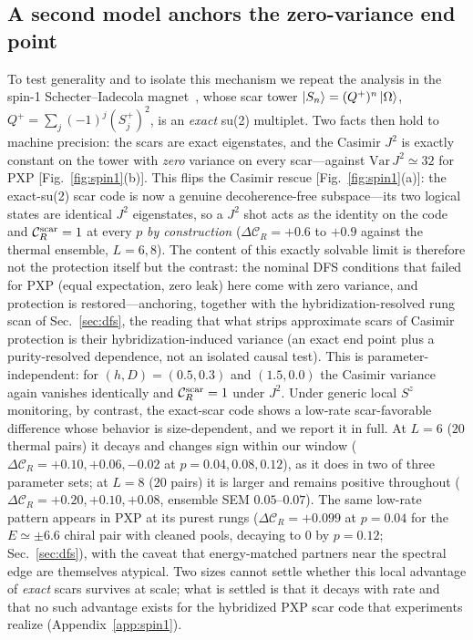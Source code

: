 \documentclass[a4paper,11pt,twocolumn,unpublished]{quantumarticle}
\newcommand{\CR}{\mathcal{C}_R}
\begin{document}
\subsection{A second model anchors the zero-variance end point}
\label{sec:spin1}
To test generality and to isolate this mechanism we repeat the analysis in the
spin-1 Schecter--Iadecola magnet~\cite{Schecter2019}, whose scar tower
$\ket{S_n}=(Q^+)^n\ket{\Omega}$, $Q^+=\sum_j(-1)^j(S_j^+)^2$, is an \emph{exact}
su(2) multiplet. Two facts then hold to machine precision: the scars are exact
eigenstates, and the Casimir $J^2$ is exactly constant on the tower with
\emph{zero} variance on every scar---against $\mathrm{Var}\,J^2\simeq32$ for PXP
[Fig.~\ref{fig:spin1}(b)]. This flips the Casimir rescue
[Fig.~\ref{fig:spin1}(a)]: the exact-su(2) scar code is now a genuine
decoherence-free subspace---its two logical states are identical $J^2$
eigenstates, so a $J^2$ shot acts as the identity on the code and
$\CR^{\rm scar}=1$ at every $p$ \emph{by construction}
($\Delta\CR=+0.6$ to $+0.9$ against the thermal ensemble, $L=6,8$). The
content of this exactly solvable limit is therefore not the protection
itself but the contrast: the nominal DFS conditions that failed for PXP
(equal expectation, zero leak) here come with zero variance, and protection
is restored---anchoring, together with the hybridization-resolved rung scan
of Sec.~\ref{sec:dfs}, the reading that what strips approximate scars of
Casimir protection is their hybridization-induced variance (an exact end
point plus a purity-resolved dependence, not an isolated causal test). This is parameter-independent: for $(h,D)=(0.5,0.3)$ and
$(1.5,0.0)$ the Casimir variance again vanishes identically and $\CR^{\rm
scar}=1$ under $J^2$. Under generic local $S^z$ monitoring, by contrast, the
exact-scar code shows a low-rate scar-favorable difference whose behavior is
size-dependent, and we report it in full. At $L=6$ ($20$ thermal pairs) it
decays and changes sign within our window
($\Delta\CR=+0.10,+0.06,-0.02$ at $p=0.04,0.08,0.12$), as it does in two of
three parameter sets; at $L=8$ ($20$ pairs) it is larger and remains positive
throughout ($\Delta\CR=+0.20,+0.10,+0.08$, ensemble SEM $0.05$--$0.07$).
The same low-rate pattern appears in PXP at its purest rungs
($\Delta\CR=+0.099$ at $p=0.04$ for the $E\simeq\pm6.6$ chiral pair with
cleaned pools, decaying to $0$ by $p=0.12$; Sec.~\ref{sec:dfs}), with the caveat that
energy-matched partners near the spectral edge are themselves atypical. Two
sizes cannot settle whether this local advantage of \emph{exact} scars
survives at scale; what is settled is that it decays with rate and that no
such advantage exists for the hybridized PXP scar code that experiments
realize (Appendix~\ref{app:spin1}).
\end{document}
